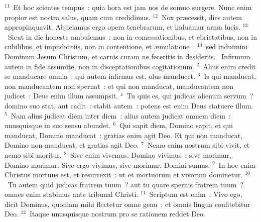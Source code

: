 ${}^{11}$~Et hoc scientes tempus~: quia hora est jam nos de somno surgere. Nunc enim propior est nostra salus, quam cum credidimus.
${}^{12}$~Nox pr\ae cessit, dies autem appropinquavit. Abjiciamus ergo opera tenebrarum, et induamur arma lucis.
${}^{13}$~Sicut in die honeste ambulemus~: non in comessationibus, et ebrietatibus, non in cubilibus, et impudicitiis, non in contentione, et \ae mulatione~:
${}^{14}$~sed induimini Dominum Jesum Christum, et carnis curam ne feceritis in desideriis.
~Infirmum autem in fide assumite, non in disceptationibus cogitationum.
${}^{2}$~Alius enim credit se manducare omnia~: qui autem infirmus est, olus manducet.
${}^{3}$~Is qui manducat, non manducantem non spernat~: et qui non manducat, manducantem non judicet~: Deus enim illum assumpsit.
${}^{4}$~Tu quis es, qui judicas alienum servum~? domino suo stat, aut cadit~: stabit autem~: potens est enim Deus statuere illum.
${}^{5}$~Nam alius judicat diem inter diem~: alius autem judicat omnem diem~: unusquisque in suo sensu abundet.
${}^{6}$~Qui sapit diem, Domino sapit, et qui manducat, Domino manducat~: gratias enim agit Deo. Et qui non manducat, Domino non manducat, et gratias agit Deo.
${}^{7}$~Nemo enim nostrum sibi vivit, et nemo sibi moritur.
${}^{8}$~Sive enim vivemus, Domino vivimus~: sive morimur, Domino morimur. Sive ergo vivimus, sive morimur, Domini sumus.
${}^{9}$~In hoc enim Christus mortuus est, et resurrexit~: ut et mortuorum et vivorum dominetur.
${}^{10}$~Tu autem quid judicas fratrem tuum~? aut tu quare spernis fratrem tuum~? omnes enim stabimus ante tribunal Christi.
${}^{11}$~Scriptum est enim~: Vivo ego, dicit Dominus, quoniam mihi flectetur omne genu~: et omnis lingua confitebitur Deo.
${}^{12}$~Itaque unusquisque nostrum pro se rationem reddet Deo.



